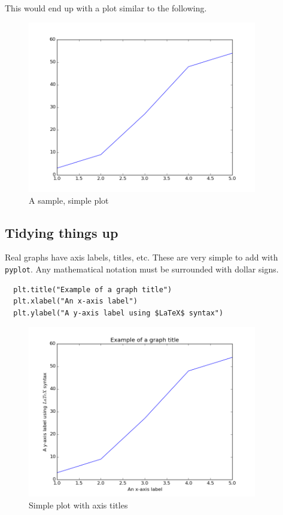 \documentclass{article}
\begin{document}
This would end up with a plot similar to the following.

\begin{figure}[H]
  \centering
  \includegraphics[width=10cm]{ch1.png}
  \caption{A sample, simple plot}
  \label{fig:ch1}
\end{figure}

\subsection{Tidying things up}
Real graphs have axis labels, titles, etc. These are very simple to
add with \texttt{pyplot}. Any mathematical notation must be surrounded
with dollar signs.

\begin{lstlisting}
  plt.title("Example of a graph title")
  plt.xlabel("An x-axis label")
  plt.ylabel("A y-axis label using $LaTeX$ syntax")
\end{lstlisting}

\begin{figure}[H]
  \centering
  \includegraphics[width=10cm]{ch2.png}
  \caption{Simple plot with axis titles}
  \label{fig:ch2}
\end{figure}
\end{document}
